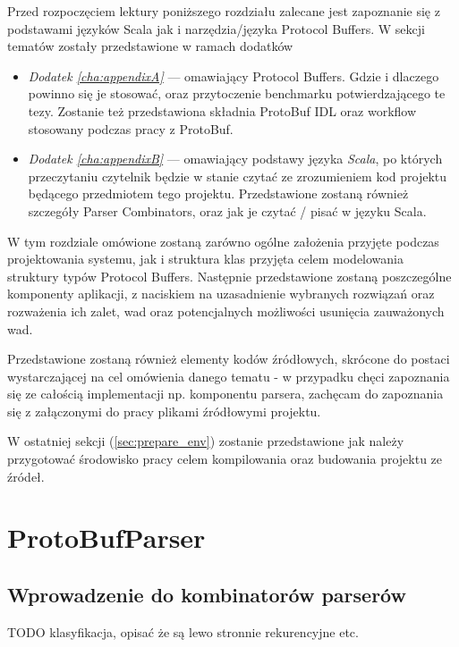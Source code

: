 \documentclass[pdflatex,11pt]{aghdpl}
\begin{document}
Przed rozpoczęciem lektury poniższego rozdziału zalecane jest zapoznanie się z podstawami języków Scala jak i narzędzia/języka Protocol Buffers. 
W sekcji tematów zostały przedstawione w ramach dodatków 
\begin{itemize}
 \item \textit{Dodatek \ref{cha:appendixA}} --- omawiający Protocol Buffers. Gdzie i dlaczego powinno się je stosować, oraz przytoczenie benchmarku potwierdzającego te tezy.
                                                Zostanie też przedstawiona składnia ProtoBuf IDL oraz workflow stosowany podczas pracy z ProtoBuf.
 \item \textit{Dodatek \ref{cha:appendixB}} --- omawiający podstawy języka \textit{Scala}, po których przeczytaniu czytelnik będzie w stanie czytać ze zrozumieniem kod
                                                projektu będącego przedmiotem tego projektu. Przedstawione zostaną również szczegóły Parser Combinators, oraz jak je czytać / pisać w języku Scala.
\end{itemize}

W tym rozdziale omówione zostaną zarówno ogólne założenia przyjęte podczas projektowania systemu, jak i struktura klas przyjęta celem
modelowania struktury typów Protocol Buffers. Następnie przedstawione zostaną poszczególne komponenty aplikacji, z naciskiem na uzasadnienie
wybranych rozwiązań oraz rozważenia ich zalet, wad oraz potencjalnych możliwości usunięcia zauważonych wad. 

Przedstawione zostaną również elementy kodów źródłowych, skrócone do postaci wystarczającej na cel omówienia danego tematu 
- w przypadku chęci zapoznania się ze całością implementacji np. komponentu parsera, zachęcam do zapoznania się 
z załączonymi do pracy plikami źródłowymi projektu.

W ostatniej sekcji (\ref{sec:prepare_env}) zostanie przedstawione jak należy przygotować środowisko pracy celem kompilowania oraz budowania projektu
ze źródeł.


\newpage
\section{ProtoBufParser}
\label{sec:protoBufParser}
\subsection{Wprowadzenie do kombinatorów parserów}
TODO klasyfikacja, opisać że są lewo stronnie rekurencyjne etc.
\end{document}
